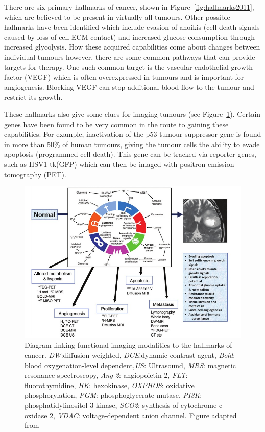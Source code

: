 \documentclass[12pt]{article}
\begin{document}
There are six primary hallmarks of cancer, shown in Figure~\ref{fig:hallmarks2011}, which are believed to be present in virtually all tumours. \cite{Hanahan:2000} Other possible hallmarks have been identified which include evasion of anoikis (cell death signals caused by loss of cell-ECM contact) and increased glucose consumption through increased glycolysis. \cite{Gatenby:2008} How these acquired capabilities come about changes between individual tumours however, there are some common pathways that can provide targets for therapy. One such common target is the vascular endothelial growth factor (VEGF) which is often overexpressed in tumours and is important for angiogenesis. Blocking VEGF can stop additional blood flow to the tumour and restrict its growth. 

These hallmarks also give some clues for imaging tumours (see Figure~\ref{fig:padhani}). Certain genes have been found to be very common in the route to gaining these capabilities. For example, inactivation of the p53 tumour suppressor gene is found in more than 50\% of  human tumours, giving the tumour cells the ability to evade apoptosis (programmed cell death). This gene can be tracked via reporter genes, such as HSV1-tk(GFP) which can then be imaged with positron emission tomography (PET). \cite{Doubrovin:2001}  


\begin{figure}[H]
\centering
\includegraphics[scale=0.6]{Padhani_2010_hallmarks.jpg}
\caption{Diagram linking functional imaging modalities to the hallmarks of cancer. \textit{DW}:diffusion weighted, \textit{DCE}:dynamic contrast agent, \textit{Bold}: blood oxygenation-level dependent,\textit{US}: Ultrasound, \textit{MRS}: magnetic resonance spectroscopy, \textit{Ang-2}: angiopoietin-2, \textit{FLT}: fluorothymidine, \textit{HK}: hexokinase, \textit{OXPHOS}: oxidative phosphorylation, \textit{PGM}: phosphoglycerate mutase, \textit{PI3K}: phosphatidylinositol 3-kinase, \textit{SCO2}: synthesis of cytochrome c oxidase 2, \textit{VDAC}: voltage-dependent anion channel. Figure adapted from \cite{Padhani:2010hfa}}
\label{fig:padhani}
\end{figure}
\end{document}
